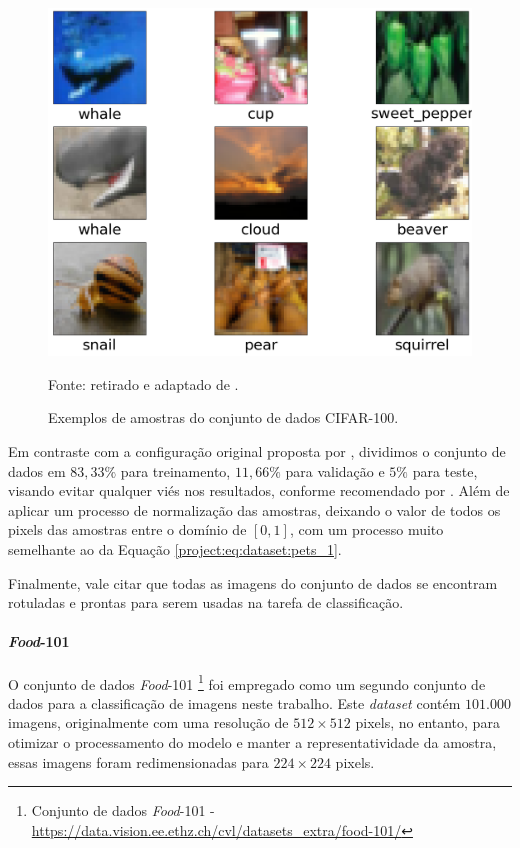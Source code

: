 \begin{figure}[H]
    \centering
    \caption{Exemplos de amostras do conjunto de dados CIFAR-100.}
    \includegraphics[width=1\textwidth]{recursos/imagens/project/cifar100v2.png}
    \label{project:fig:dataset:cifar}

    Fonte: retirado e adaptado de \cite{Krizhevsky2014TheDataset}.
\end{figure}

Em contraste com a configuração original proposta por \cite{Krizhevsky2014TheDataset}, dividimos o conjunto de dados em $83,33\%$ para treinamento, $11,66\%$ para validação e $5\%$ para teste, visando evitar qualquer viés nos resultados, conforme recomendado por \cite{Domingos2012ALearning}. Além de aplicar um processo de normalização das amostras, deixando o valor de todos os pixels das amostras entre o domínio de $[0, 1]$, com um processo muito semelhante ao da Equação \ref{project:eq:dataset:pets_1}.

Finalmente, vale citar que todas as imagens do conjunto de dados se encontram rotuladas e prontas para serem usadas na tarefa de classificação.

\paragraph{\textit{Food}-101}
\label{project:dataset:food101}
O conjunto de dados \textit{Food}-101 \footnote{Conjunto de dados \textit{Food}-101 - \url{https://data.vision.ee.ethz.ch/cvl/datasets_extra/food-101/}} \citep{Bossard2014Food-101Forests} foi empregado como um segundo conjunto de dados para a classificação de imagens neste trabalho. Este \textit{dataset} contém $101.000$ imagens, originalmente com uma resolução de $512 \times 512$ pixels, no entanto, para otimizar o processamento do modelo e manter a representatividade da amostra, essas imagens foram redimensionadas para $224 \times 224$ pixels.

